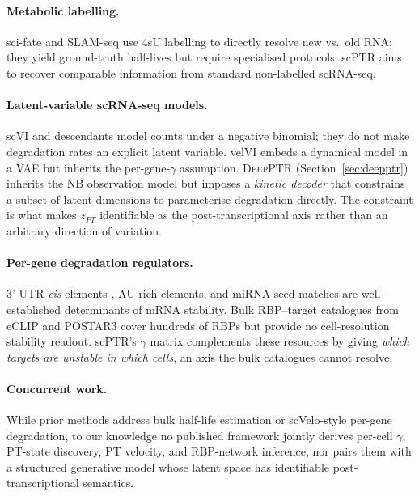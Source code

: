 \documentclass{article}
\begin{document}
\paragraph{Metabolic labelling.} sci-fate \cite{cao2020} and SLAM-seq \cite{herzog2017} use 4sU labelling to directly resolve new vs.\ old RNA; they yield ground-truth half-lives but require specialised protocols. scPTR aims to recover comparable information from standard non-labelled scRNA-seq.

\paragraph{Latent-variable scRNA-seq models.} scVI \cite{lopez2018} and descendants model counts under a negative binomial; they do not make degradation rates an explicit latent variable. velVI \cite{gayoso2024} embeds a dynamical model in a VAE but inherits the per-gene-$\gamma$ assumption. \textsc{DeepPTR} (Section~\ref{sec:deepptr}) inherits the NB observation model but imposes a \textit{kinetic decoder} that constrains a subset of latent dimensions to parameterise degradation directly. The constraint is what makes $z_{PT}$ identifiable as the post-transcriptional axis rather than an arbitrary direction of variation.

\paragraph{Per-gene degradation regulators.} 3' UTR \textit{cis}-elements \cite{hentze2018}, AU-rich elements, and miRNA seed matches \cite{lewis2005} are well-established determinants of mRNA stability. Bulk RBP--target catalogues from eCLIP \cite{vannostrand2020} and POSTAR3 cover hundreds of RBPs but provide no cell-resolution stability readout. scPTR's $\gamma$ matrix complements these resources by giving \textit{which targets are unstable in which cells}, an axis the bulk catalogues cannot resolve.

\paragraph{Concurrent work.} While prior methods address bulk half-life estimation \cite{eisen2020} or scVelo-style per-gene degradation, to our knowledge no published framework jointly derives per-cell $\gamma$, PT-state discovery, PT velocity, and RBP-network inference, nor pairs them with a structured generative model whose latent space has identifiable post-transcriptional semantics.
\end{document}
